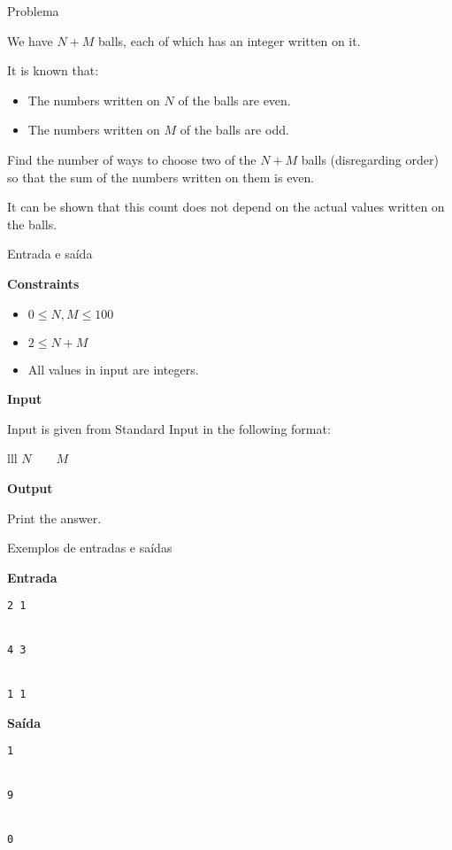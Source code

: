 \begin{frame}[fragile]{Problema}

We have $N+M$ balls, each of which has an integer written on it.

It is known that:
\begin{itemize}
    \item The numbers written on $N$ of the balls are even.
    \item The numbers written on $M$ of the balls are odd.
\end{itemize}

Find the number of ways to choose two of the $N+M$ balls (disregarding order) so that the sum of the numbers written on them is even.

It can be shown that this count does not depend on the actual values written on the balls.

\end{frame}

\begin{frame}[fragile]{Entrada e saída}

\textbf{Constraints}

\begin{itemize}
    \item $0\leq N, M\leq 100$
    \item $2\leq N + M$
    \item All values in input are integers.
\end{itemize}

\vspace{0.1in}

\textbf{Input}

Input is given from Standard Input in the following format:
\begin{atcoderio}{lll}
$N$\ \ \ \ $M$ \\
\end{atcoderio}

\textbf{Output}

Print the answer.

\end{frame}

\begin{frame}[fragile]{Exemplos de entradas e saídas}

\begin{minipage}[t]{0.45\textwidth}
\textbf{Entrada}
\begin{verbatim}
2 1


4 3


1 1
\end{verbatim}
\end{minipage}
\begin{minipage}[t]{0.5\textwidth}
\textbf{Saída}
\begin{verbatim}
1


9


0
\end{verbatim}
\end{minipage}
\end{frame}



